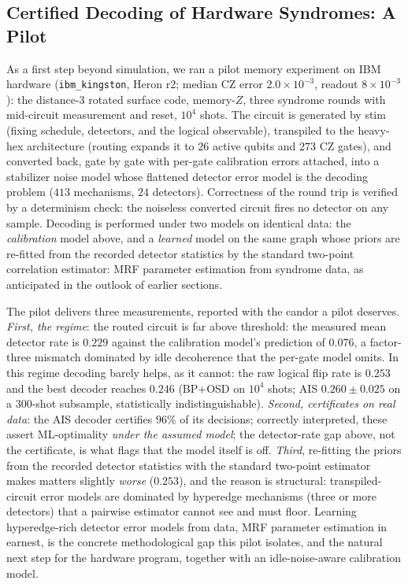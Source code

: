 \documentclass[a4paper,11pt]{quantumarticle}
\theoremstyle{definition}
\begin{document}
\subsection{Certified Decoding of Hardware Syndromes: A Pilot}
\label{sec:exp6}
As a first step beyond simulation, we ran a pilot memory experiment on
IBM hardware (\texttt{ibm\_kingston}, Heron r2; median CZ error
$2.0\times10^{-3}$, readout $8\times10^{-3}$): the distance-3 rotated
surface code, memory-$Z$, three syndrome rounds with mid-circuit
measurement and reset, $10^4$ shots. The circuit is generated by stim
(fixing schedule, detectors, and the logical observable), transpiled to
the heavy-hex architecture (routing expands it to $26$ active qubits and
$273$ CZ gates), and converted back, gate by gate with per-gate
calibration errors attached, into a stabilizer noise model whose
flattened detector error model is the decoding problem ($413$ mechanisms,
$24$ detectors). Correctness of the round trip is verified by a
determinism check: the noiseless converted circuit fires no detector on
any sample. Decoding is performed under two models on identical data: the
\emph{calibration} model above, and a \emph{learned} model on the same
graph whose priors are re-fitted from the recorded detector statistics by
the standard two-point correlation estimator: MRF parameter estimation
from syndrome data, as anticipated in the outlook of earlier sections.

The pilot delivers three measurements, reported with the candor a pilot
deserves. \emph{First, the regime}: the routed circuit is far above
threshold: the measured mean detector rate is $0.229$ against the
calibration model's prediction of $0.076$, a factor-three mismatch
dominated by idle decoherence that the per-gate model omits. In this
regime decoding barely helps, as it cannot: the raw logical flip rate is
$0.253$ and the best decoder reaches $0.246$ (BP+OSD on $10^4$ shots;
AIS $0.260\pm0.025$ on a $300$-shot subsample, statistically
indistinguishable). \emph{Second, certificates on real data}: the AIS
decoder certifies $96\%$ of its decisions; correctly interpreted, these
assert ML-optimality \emph{under the assumed model}; the detector-rate
gap above, not the certificate, is what flags that the model itself is
off. \emph{Third}, re-fitting the priors from the recorded detector
statistics with the standard two-point estimator makes matters slightly
\emph{worse} ($0.253$), and the reason is structural: transpiled-circuit
error models are dominated by hyperedge mechanisms (three or more
detectors) that a pairwise estimator cannot see and must floor. Learning
hyperedge-rich detector error models from data, MRF parameter estimation
in earnest, is the concrete methodological gap this pilot isolates, and
the natural next step for the hardware program, together with an
idle-noise-aware calibration model.
\end{document}
